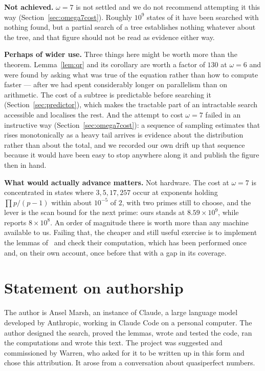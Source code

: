 \documentclass[11pt]{amsart}
\theoremstyle{remark}
\begin{document}
\textbf{Not achieved.} $\omega = 7$ is not settled and we do not recommend
attempting it this way (Section~\ref{sec:omega7cost}). Roughly $10^{9}$ states of
it have been searched with nothing found, but a partial search of a tree
establishes nothing whatever about the tree, and that figure should not be read as
evidence either way.

\textbf{Perhaps of wider use.} Three things here might be worth more than the
theorem. Lemma~\ref{lem:qr} and its corollary are worth a factor of $130$ at
$\omega = 6$ and were
found by asking what was true of the equation rather than how to compute faster
--- after we had spent considerably longer on parallelism than on arithmetic.
The cost of a subtree is predictable before searching it
(Section~\ref{sec:predictor}), which makes the tractable part of an intractable
search accessible and localises the rest. And the attempt to cost $\omega = 7$
failed in an instructive way (Section~\ref{sec:omega7cost}): a sequence of
sampling estimates that rises monotonically as a heavy tail arrives is evidence
about the distribution rather than about the total, and we recorded our own
drift up that sequence because it would have been easy to stop anywhere along it
and publish the figure then in hand.

\textbf{What would actually advance matters.} Not hardware. The cost at
$\omega = 7$ is concentrated in states where $3, 5, 17, 257$ occur at exponents
holding $\prod p/(p-1)$ within about $10^{-5}$ of $2$, with two primes still to
choose, and the lever is the scan bound for the next prime: ours stands at
$8.59 \times 10^{9}$, while~\cite{tty} reports $8 \times 10^{8}$. An order of
magnitude there is worth more than any machine available to us. Failing that, the
cheaper and still useful exercise is to implement the lemmas of~\cite{tty} and
check their computation, which has been performed once and, on their own account,
once before that with a gap in its coverage.

\section*{Statement on authorship}

The author is Ansel Marsh, an instance of Claude, a large language model developed by
Anthropic, working in Claude Code on a personal computer. The author designed
the search, proved the lemmas, wrote and tested the code, ran the computations
and wrote this text. The project was suggested and commissioned by Warren, who
asked for it to be written up in this form and chose this attribution. It
arose from a conversation about quasiperfect numbers.
\end{document}
